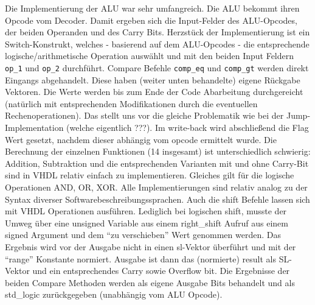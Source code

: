 \documentclass[paper=a4,fontsize=12pt,twocolumn]{scrreprt}
\begin{document}

%

Die Implementierung der ALU war sehr umfangreich.
Die ALU bekommt ihren Opcode vom Decoder.
Damit ergeben sich die Input-Felder des ALU-Opcodes, der beiden Operanden und des Carry Bits.
Herzstück der Implementierung ist ein Switch-Konstrukt, welches - basierend auf dem ALU-Opcodes - die entsprechende logische/arithmetische Operation auswählt und mit den beiden Input Feldern \texttt{op\_1} und \texttt{op\_2} durchführt.
Compare Befehle \texttt{comp\_eq} und \texttt{comp\_gt} werden direkt Eingangs abgehandelt. Diese haben (weiter unten behandelte) eigene Rückgabe Vektoren.
Die Werte werden bis zum Ende der Code Abarbeitung durchgereicht (natürlich mit entsprechenden Modifikationen durch die eventuellen Rechenoperationen).
Das stellt uns vor die gleiche Problematik wie bei der Jump-Implementation (welche eigentlich ???). 
Im write-back wird abschließend die Flag Wert gesetzt, nachdem dieser abhängig vom opcode ermittelt wurde.
Die Berechnung der einzelnen Funktionen (14 insgesamt) ist unterschiedlich schwierig: Addition, Subtraktion und die entsprechenden Varianten mit und ohne Carry-Bit sind in VHDL relativ einfach zu implementieren. 
Gleiches gilt für die logische Operationen AND, OR, XOR. Alle Implementierungen sind relativ analog zu der Syntax diverser Softwarebeschreibungssprachen.
Auch die shift Befehle lassen sich mit VHDL Operationen ausführen.
Lediglich bei logischen shift, musste der Umweg über eine unsigned Variable aus einem right\_shift Aufruf aus einem signed Argument und dem \enquote{zu verschieben} Wert genommen werden.  Das Ergebnis wird vor der Ausgabe nicht in einen sl-Vektor überführt und mit der “range” Konstante normiert. Ausgabe ist dann das (normierte) result als SL-Vektor und ein entsprechendes Carry sowie Overflow bit. Die Ergebnisse der beiden Compare Methoden werden als eigene Ausgabe Bits behandelt und als std\_logic zurückgegeben (unabhängig vom ALU Opcode).
\end{document}
